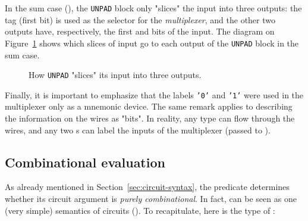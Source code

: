             In the sum case (), the \texttt{UNPAD} block only "slices" the input into three outputs:
            the tag (first bit) is used as the selector for the \emph{multiplexer}, and the other two outputs
            have, respectively, the first  and  bits of the input.
            The diagram on Figure~\ref{fig:semantics-syn-unpad} shows which slices of input go to each
            output of the \texttt{UNPAD} block in the sum case.

            \begin{figure}[ht]
                \caption{How \texttt{UNPAD} "slices" its input into three outputs.\label{fig:semantics-syn-unpad}}
            \end{figure}

            Finally, it is important to emphasize that the labels \texttt{'0'} and \texttt{'1'}
            were used in the multiplexer only as a mnemonic device.
            The same remark applies to describing the information on the wires as "bits".
            In reality, any  type can flow through the wires, and any two s
            can label the inputs of the multiplexer (passed to ).


        \subsection{Combinational evaluation}
        \label{subsec:combinational-eval}

            As already mentioned in Section~\ref{sec:circuit-syntax},
            the  predicate determines whether its circuit argument is \emph{purely combinational}.
            In fact,  can be seen as one (very simple) semantics of circuits ().
            To recapitulate, here is the type of :

